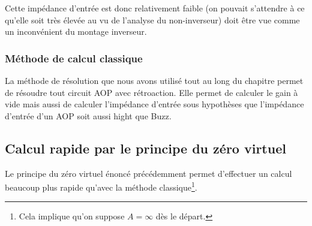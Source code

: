 \documentclass	[11pt, a4paper, openany]{book}
\begin{document}
Cette impédance d'entrée est donc relativement faible (on pouvait s'attendre à ce qu'elle soit très élevée au vu de l'analyse du non-inverseur) doit être vue comme un inconvénient du montage inverseur.

\subsubsection{Méthode de calcul classique}
La méthode de résolution que nous avons utilisé tout au long du chapitre permet de résoudre tout circuit AOP avec rétroaction. Elle permet de calculer le gain à vide mais aussi de calculer l'impédance d'entrée sous hypothèses que l'impédance d'entrée d'un AOP soit aussi hight que Buzz.

\subsection{Calcul rapide par le principe du zéro virtuel}
Le principe du zéro virtuel énoncé précédemment permet d'effectuer un calcul beaucoup plus rapide qu'avec la méthode classique\footnote{Cela implique qu'on suppose $A = \infty$ dès le départ.}.

\newpage
\end{document}
